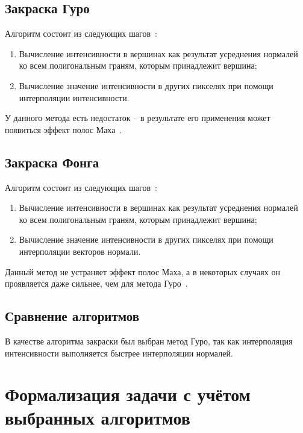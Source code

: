 \subsection{Закраска Гуро}

Алгоритм состоит из следующих шагов~\cite{gaf}:

\begin{enumerate}[label=\arabic*.]
	\item Вычисление интенсивности в вершинах как результат усреднения нормалей ко всем полигональным граням, которым принадлежит вершина;
	\item Вычисление значение интенсивности в других пикселях при помощи интерполяции интенсивности. 
\end{enumerate}

У данного метода есть недостаток -- в результате его применения может появиться эффект полос Маха~\cite{cannon}.

\subsection{Закраска Фонга}

Алгоритм состоит из следующих шагов~\cite{gaf}:

\begin{enumerate}[label=\arabic*.]
	\item Вычисление интенсивности в вершинах как результат усреднения нормалей ко всем полигональным граням, которым принадлежит вершина;
	\item Вычисление значение интенсивности в других пикселях при помощи интерполяции векторов нормали. 
\end{enumerate}

Данный метод не устраняет эффект полос Маха, а в некоторых случаях он проявляется даже сильнее, чем для метода Гуро~\cite{cannon}.

\subsection{Сравнение алгоритмов}

В качестве алгоритма закраски был выбран метод Гуро, так как интерполяция интенсивности выполняется быстрее интерполяции нормалей.

\section{Формализация задачи с учётом выбранных алгоритмов}

